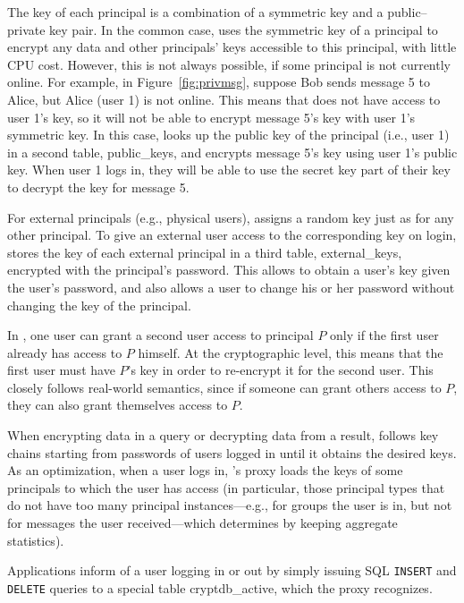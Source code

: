 The key of each principal is  a combination of a symmetric key
and a public--private key pair.  In the common case, \name uses the
symmetric key of a principal to encrypt any data and other principals'
keys accessible to this principal, with little CPU cost.  However, this is not always
possible, if some principal is not currently online.  For example,
in Figure~\ref{fig:privmsg}, suppose Bob sends message 5 to Alice, but
Alice (user 1) is not online.  This means that \name does not have access
to user 1's key, so it will not be able to encrypt message 5's key with
user 1's symmetric key.  In this case, \name looks up the public key
of the principal (i.e., user 1) in a second table, \textsf{public\_keys}, and encrypts
message 5's key using user 1's public key.  When user 1 logs in, they
will be able to use the secret key part of their key to decrypt the
key for message 5.

For external principals (e.g., physical users), \name assigns a
random key just as for any other principal.  To give an external user
access to the corresponding key on login, \name stores the key of each
external principal in a third table, \textsf{external\_keys}, encrypted
with the principal's password.  This allows \name to obtain a user's
key given the user's password, and also allows a user to change his or
her password without changing the key of the principal.

In \name{}, one user can grant a second user access to principal $P$
only if the first user already has access to $P$ himself.  At the
cryptographic level, this means that the first user must have $P$'s
key in order to re-encrypt it for the second user.  This closely
follows real-world semantics, since if someone can grant others
access to $P$, they can also grant themselves access to $P$.

When encrypting data in a query or decrypting data from a result,
\name{} follows key chains starting from passwords of users logged in
until it obtains the desired keys. As an optimization, when a user
logs in, \name{}'s proxy loads the keys of some principals to which
the user has access (in particular, those principal types that do not
have too many principal instances---e.g., for groups the user is in,
but not for messages the user received---which \name determines by
keeping aggregate statistics).

Applications inform \name{} of a user logging in or out by simply
issuing SQL {\tt INSERT} and {\tt DELETE} queries to a special table
\textsf{cryptdb\_active}, which the proxy recognizes.

